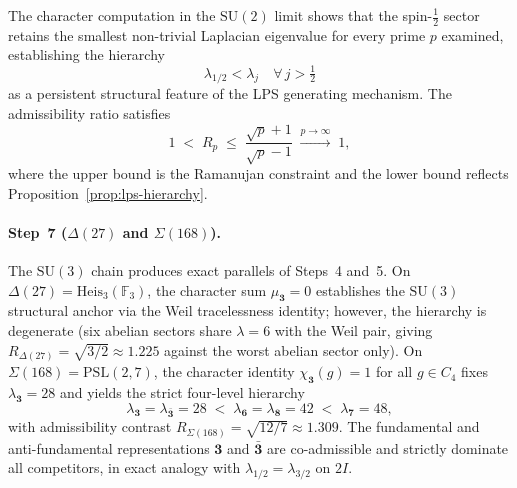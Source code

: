 \documentclass[11pt,a4paper]{article}
\begin{document}
    The character computation in the $\mathrm{SU}(2)$ limit shows that the
    spin-$\tfrac{1}{2}$ sector retains the smallest non-trivial Laplacian
    eigenvalue for every prime $p$ examined, establishing the hierarchy
    \begin{equation}
      \lambda_{1/2} < \lambda_j \quad \forall\, j > \tfrac{1}{2}
      \label{eq:lps-hierarchy-concl}
    \end{equation}
    as a persistent structural feature of the LPS generating mechanism.
    The admissibility ratio satisfies
    \begin{equation}
      1 \;<\; R_p \;\leq\; \frac{\sqrt{p}+1}{\sqrt{p}-1}
      \;\xrightarrow{p\to\infty}\; 1,
      \label{eq:Rp-concl}
    \end{equation}
    where the upper bound is the Ramanujan constraint and the lower bound
    reflects Proposition~\ref{prop:lps-hierarchy}.

  \paragraph{Step~7 ($\Delta(27)$ and $\Sigma(168)$).}
    The $\mathrm{SU}(3)$ chain produces exact parallels of Steps~4 and~5.
    On $\Delta(27) = \mathrm{Heis}_3(\mathbb{F}_3)$, the character sum
    $\mu_{\mathbf{3}} = 0$ establishes the $\mathrm{SU}(3)$ structural anchor via
    the Weil tracelessness identity; however, the hierarchy is degenerate (six abelian
    sectors share $\lambda = 6$ with the Weil pair, giving $R_{\Delta(27)} =
    \sqrt{3/2} \approx 1.225$ against the worst abelian sector only).
    On $\Sigma(168) = \mathrm{PSL}(2,7)$, the character identity
    $\chi_{\mathbf{3}}(g) = 1$ for all $g \in C_4$ fixes $\lambda_{\mathbf{3}} = 28$ and
    yields the strict four-level hierarchy
    \begin{equation}
      \lambda_{\mathbf{3}} = \lambda_{\bar{\mathbf{3}}} = 28
      \;<\;
      \lambda_{\mathbf{6}} = \lambda_{\mathbf{8}} = 42
      \;<\;
      \lambda_{\mathbf{7}} = 48,
      \label{eq:sigma168-ordering-concl}
    \end{equation}
    with admissibility contrast $R_{\Sigma(168)} = \sqrt{12/7} \approx 1.309$.
    The fundamental and anti-fundamental representations $\mathbf{3}$ and $\bar{\mathbf{3}}$
    are co-admissible and strictly dominate all competitors, in exact analogy with
    $\lambda_{1/2} = \lambda_{3/2}$ on $2I$.
\end{document}

